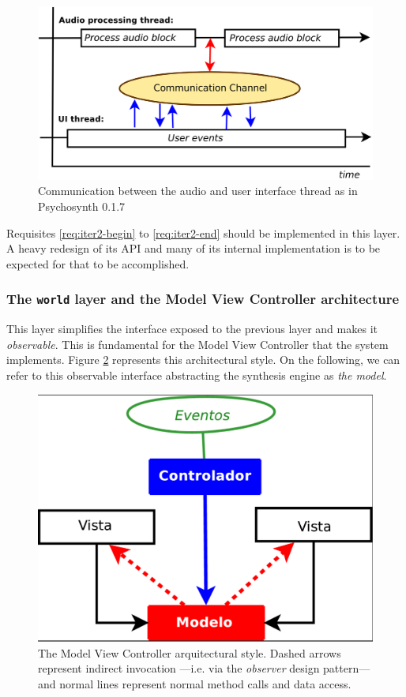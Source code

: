 \begin{figure}[h]
\centering
\includegraphics[width=.7\textwidth]{pic/thread.png}
\caption{Communication between the audio and user interface thread as
  in Psychosynth 0.1.7}
\label{fig:thread}
\end{figure}

Requisites \ref{req:iter2-begin} to \ref{req:iter2-end} should be
implemented in this layer. A heavy redesign of its API and many of its
internal implementation is to be expected for that to be accomplished.

\subsubsection{The \texttt{world} layer and the Model View Controller
  architecture}

This layer simplifies the interface exposed to the previous layer and
makes it \emph{observable}. This is fundamental for the Model View
Controller that the system implements.  Figure \ref{fig:mvc}
represents this architectural style. On the following, we can refer to
this observable interface abstracting the synthesis engine as
\emph{the model}.

\begin{figure}[h!] \centering
\includegraphics[width=.5\textwidth]{pic/mvc.png}


\caption[The MVC architectural style]{The Model View Controller
  arquitectural style. Dashed arrows represent indirect invocation
  ---i.e. via the \emph{observer} design pattern--- and normal lines
  represent normal method calls and data access.}
\label{fig:mvc}
\end{figure}

